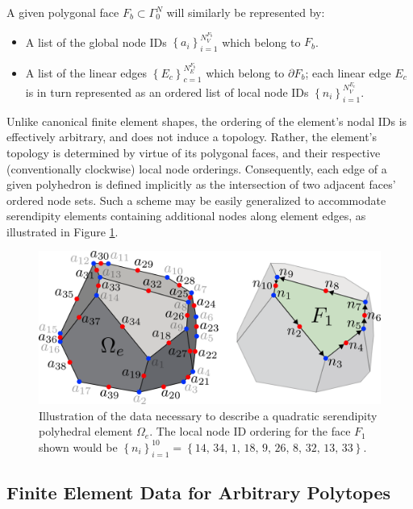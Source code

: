 	A given polygonal face $F_b \subset \Gamma^N_0$ will similarly be represented by:
	\begin{itemize}
		\item A list of the global node IDs $\left\{ a_i \right\}_{i=1}^{N^{F_b}_V}$ which belong to $F_b$.
		\item A list of the linear edges $\left\{ E_{c} \right\}_{c=1}^{N^{F_b}_E}$ which belong to $\partial F_b$; each linear edge $E_c$ is in turn represented as an ordered list of local node IDs $\left\{ n_i \right\}_{i=1}^{N^{E_c}_V}$.
	\end{itemize}
	
	Unlike canonical finite element shapes, the ordering of the element's nodal IDs is effectively arbitrary, and does not induce a topology. Rather, the element's topology is determined by virtue of its polygonal faces, and their respective (conventionally clockwise) local node orderings. Consequently, each edge of a given polyhedron is defined implicitly as the intersection of two adjacent faces' ordered node sets. Such a scheme may be easily generalized to accommodate serendipity elements containing additional nodes along element edges, as illustrated in Figure \ref{fig:polyhedron_data_quadratic}.
	\begin{figure} [!ht]
		\centering
		\includegraphics[width = 6.0in]{figures/polyhedron_data_quadratic.pdf}
		\caption{Illustration of the data necessary to describe a quadratic serendipity polyhedral element $\Omega_e$. The local node ID ordering for the face $F_1$ shown would be $\left\{ n_i \right\}_{i=1}^{10} = \left\{ 14, \, 34, \, 1, \, 18, \, 9, \, 26, \, 8, \, 32, \, 13, \, 33 \right\}$.}
		\label{fig:polyhedron_data_quadratic}
	\end{figure}
	
\subsection*{Finite Element Data for Arbitrary Polytopes}

